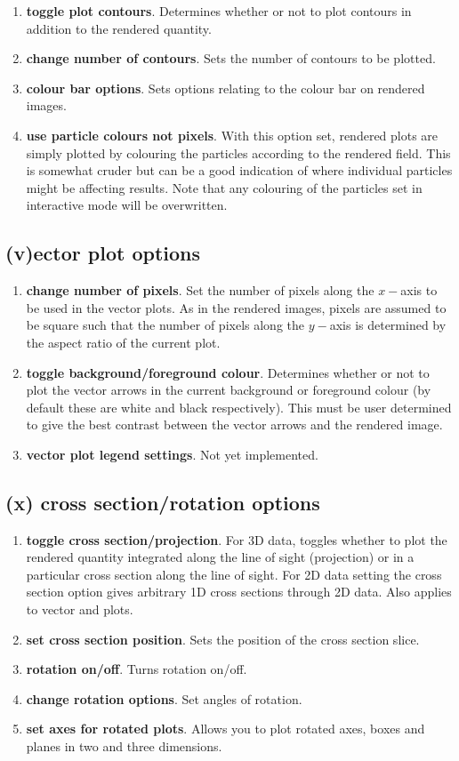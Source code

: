 \documentclass[a4paper,11pt]{article}
\begin{document}
\begin{enumerate}
\item \textbf{toggle plot contours}. Determines whether or not to plot contours
in addition to the rendered quantity.
\item \textbf{change number of contours}. Sets the number of contours to be
plotted. 
\item \textbf{colour bar options}. Sets options relating to the colour
bar on rendered images.
\item \textbf{use particle colours not pixels}. With this option set, rendered plots are
simply plotted by colouring the particles according to the rendered field. This is somewhat
cruder but can be a good indication of where individual particles might be affecting results.
Note that any colouring of the particles set in interactive mode will be overwritten.
\end{enumerate}

\subsection{(v)ector plot options}
\begin{enumerate}
\item \textbf{change number of pixels}. Set the number of pixels along the
$x-$axis to be used in the vector plots. As in the rendered images, pixels are assumed to be square such that the number of pixels along
the $y-$axis is determined by the aspect ratio of the current plot.
\item \textbf{toggle background/foreground colour}. Determines whether or not to
plot the vector arrows in the current background or foreground colour (by
default these are white and black respectively). This must
be user determined to give the best contrast between the vector arrows and the
rendered image.
\item \textbf{vector plot legend settings}. Not yet implemented.
\end{enumerate}

\subsection{(x) cross section/rotation options}
\begin{enumerate}
\item \textbf{toggle cross section/projection}. For 3D data, toggles whether to
plot the rendered quantity integrated along the line of sight (projection) or in
a particular cross section along the line of sight. For 2D data setting the
cross section option gives arbitrary 1D cross sections through 2D data. Also applies to vector and plots.
\item \textbf{set cross section position}. Sets the position of the cross section slice.
\item \textbf{rotation on/off}. Turns rotation on/off.
\item \textbf{change rotation options}. Set angles of rotation.
\item \textbf{set axes for rotated plots}. Allows you to plot rotated axes, boxes and planes
in two and three dimensions.
\end{enumerate}
\end{document}
